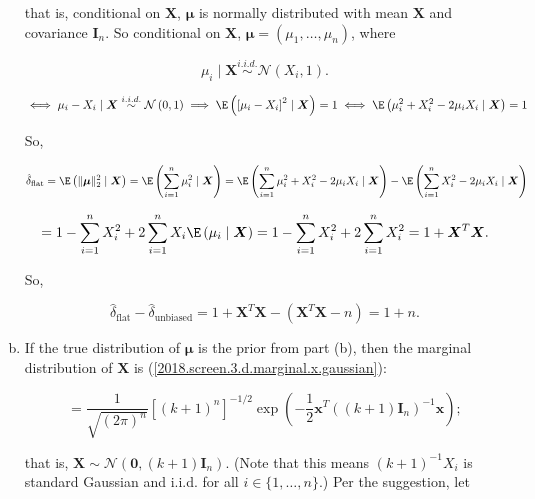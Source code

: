 \begin{solution}
\begin{enumerate}[(a)]
that is, conditional on \(\boldsymbol{X}\), \(\boldsymbol{\mu}\) is normally distributed with mean \(\boldsymbol{X}\) and covariance \(\boldsymbol{I}_n\). So  conditional on \(\boldsymbol{X}\), \(\boldsymbol{\mu} = (\mu_1, \ldots, \mu_n)\), where

\[
\mu_i  \mid \boldsymbol{X} \overset{i.i.d.}{\sim} \mathcal{N} \left(  X_i, 1 \right).
\]

\begin{equation}
 \iff  \mu_i -  X_i  \mid \boldsymbol{X} \overset{i.i.d.}{\sim} \mathcal{N} \left(0, 1\right)  \implies  \E \left( \left[ \mu_i -   X_i \right]^2  \mid \boldsymbol{X}  \right) = 1 \iff   \E \left(  \mu_i  ^2  + X_i^2 -  2\mu_i X_i  \mid \boldsymbol{X}  \right) = 1 
\end{equation}

So,

\[
\hat{\delta}_{\text{flat}} = \E \left( \lVert \boldsymbol{\mu} \rVert_2^2 \mid \boldsymbol{X} \right) = \E \left( \sum_{i=1}^n \mu_i^2 \mid \boldsymbol{X}  \right) = \E \left( \sum_{i=1}^n  \mu_i  ^2  + X_i^2 -  2\mu_i X_i  \mid \boldsymbol{X}  \right) -  \E \left( \sum_{i=1}^n  X_i^2 - 2 \mu_i X_i  \mid \boldsymbol{X}  \right)
\]

\[
= 1 -  \sum_{i=1}^n  X_i^2  + 2 \sum_{i=1}^n  X_i  \E \left( \mu_i  \mid \boldsymbol{X}  \right)  = 1 -  \sum_{i=1}^n  X_i^2  + 2 \sum_{i=1}^n  X_i^2  = 1 + \boldsymbol{X}^T\boldsymbol{X}.  
\]

So,

\begin{equation}\label{2018.screen.3.c.flat.unbiased.difference}
\hat{\delta}_{\text{flat}}  - \hat{\delta}_{\text{unbiased}} = 1 + \boldsymbol{X}^T\boldsymbol{X} - \left( \boldsymbol{X}^T\boldsymbol{X} - n \right) = 1 + n.
\end{equation}


\item If the true distribution of \(\boldsymbol{\mu}\) is the prior from part (b), then the marginal distribution of \(\boldsymbol{X}\) is (\ref{2018.screen.3.d.marginal.x.gaussian}):

\[
=\frac{1}{\sqrt{(2 \pi )^n}} \left[ \left( k+1 \right)^n \right]^{-1/2} \exp \left(- \frac{1}{2} \boldsymbol{x}^T \left( (k+1) \boldsymbol{I}_n \right)^{-1} \boldsymbol{x}   \right);
\]

that is, \(\boldsymbol{X} \sim \mathcal{N} (\boldsymbol{0}, (k+1)\boldsymbol{I}_n)\). (Note that this means \( (k+1)^{-1} X_i \) is standard Gaussian and i.i.d. for all \(i \in \{1, \ldots, n\}\).) Per the suggestion, let 


\end{enumerate}
\end{solution}
